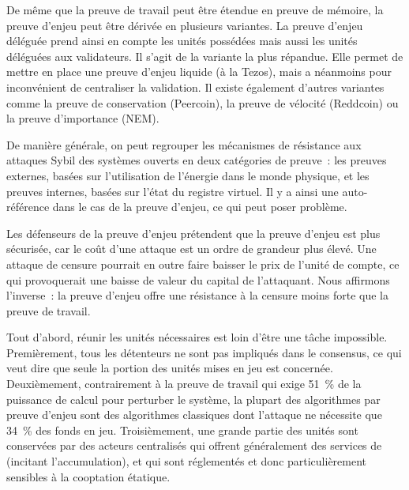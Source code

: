 De même que la preuve de travail peut être étendue en preuve de mémoire, la preuve d'enjeu peut être dérivée en plusieurs variantes. La preuve d'enjeu déléguée prend ainsi en compte les unités possédées mais aussi les unités déléguées aux validateurs. Il s'agit de la variante la plus répandue. Elle permet de mettre en place une preuve d'enjeu liquide (à la Tezos), mais a néanmoins pour inconvénient de centraliser la validation. Il existe également d'autres variantes comme la preuve de conservation (Peercoin), la preuve de vélocité (Reddcoin) ou la preuve d'importance (NEM).

De manière générale, on peut regrouper les mécanismes de résistance aux attaques Sybil des systèmes ouverts en deux catégories de preuve~: les preuves externes, basées sur l'utilisation de l'énergie dans le monde physique, et les preuves internes, basées sur l'état du registre virtuel. Il y a ainsi une auto-référence dans le cas de la preuve d'enjeu, ce qui peut poser problème.


Les défenseurs de la preuve d'enjeu prétendent que la preuve d'enjeu est plus sécurisée, car le coût d'une attaque est un ordre de grandeur plus élevé. Une attaque de censure pourrait en outre faire baisser le prix de l'unité de compte, ce qui provoquerait une baisse de valeur du capital de l'attaquant. Nous affirmons l'inverse~: la preuve d'enjeu offre une résistance à la censure moins forte que la preuve de travail.

Tout d'abord, réunir les unités nécessaires est loin d'être une tâche impossible. Premièrement, tous les détenteurs ne sont pas impliqués dans le consensus, ce qui veut dire que seule la portion des unités mises en jeu est concernée. Deuxièmement, contrairement à la preuve de travail qui exige 51~\% de la puissance de calcul pour perturber le système, la plupart des algorithmes par preuve d'enjeu sont des algorithmes classiques dont l'attaque ne nécessite que 34~\% des fonds en jeu. Troisièmement, une grande partie des unités sont conservées par des acteurs centralisés qui offrent généralement des services de  (incitant l'accumulation), et qui sont réglementés et donc particulièrement sensibles à la cooptation étatique.

